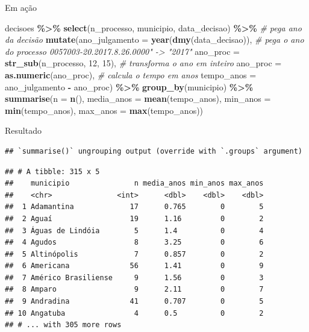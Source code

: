 \documentclass[
  10pt,
  ignorenonframetext,
]{beamer}
\newenvironment{Shaded}{\begin{snugshade}}{\end{snugshade}}
\newcommand{\CommentTok}[1]{\textcolor[rgb]{0.56,0.35,0.01}{\textit{#1}}}
\newcommand{\DataTypeTok}[1]{\textcolor[rgb]{0.13,0.29,0.53}{#1}}
\newcommand{\DecValTok}[1]{\textcolor[rgb]{0.00,0.00,0.81}{#1}}
\newcommand{\KeywordTok}[1]{\textcolor[rgb]{0.13,0.29,0.53}{\textbf{#1}}}
\newcommand{\NormalTok}[1]{#1}
\newcommand{\OperatorTok}[1]{\textcolor[rgb]{0.81,0.36,0.00}{\textbf{#1}}}
\newcommand{\StringTok}[1]{\textcolor[rgb]{0.31,0.60,0.02}{#1}}
\begin{document}
\begin{frame}[fragile]{Em ação}
\protect\hypertarget{em-auxe7uxe3o-3}{}
\begin{Shaded}
\begin{Highlighting}[]
\NormalTok{decisoes }\OperatorTok{\%\textgreater{}\%}\StringTok{ }
\StringTok{  }\KeywordTok{select}\NormalTok{(n\_processo, municipio, data\_decisao) }\OperatorTok{\%\textgreater{}\%}
\StringTok{  }\CommentTok{\#        pega ano da decisão}
\StringTok{  }\KeywordTok{mutate}\NormalTok{(}\DataTypeTok{ano\_julgamento =} \KeywordTok{year}\NormalTok{(}\KeywordTok{dmy}\NormalTok{(data\_decisao)),}
         \CommentTok{\# pega o ano do processo 0057003{-}20.2017.8.26.0000" {-}\textgreater{} "2017"}
         \DataTypeTok{ano\_proc =} \KeywordTok{str\_sub}\NormalTok{(n\_processo, }\DecValTok{12}\NormalTok{, }\DecValTok{15}\NormalTok{),}
         \CommentTok{\# transforma o ano em inteiro}
         \DataTypeTok{ano\_proc =} \KeywordTok{as.numeric}\NormalTok{(ano\_proc),}
         \CommentTok{\# calcula o tempo em anos}
         \DataTypeTok{tempo\_anos =}\NormalTok{ ano\_julgamento }\OperatorTok{{-}}\StringTok{ }\NormalTok{ano\_proc) }\OperatorTok{\%\textgreater{}\%}\StringTok{ }
\StringTok{  }\KeywordTok{group\_by}\NormalTok{(municipio) }\OperatorTok{\%\textgreater{}\%}\StringTok{ }
\StringTok{  }\KeywordTok{summarise}\NormalTok{(}\DataTypeTok{n =} \KeywordTok{n}\NormalTok{(),}
            \DataTypeTok{media\_anos =} \KeywordTok{mean}\NormalTok{(tempo\_anos),}
            \DataTypeTok{min\_anos =} \KeywordTok{min}\NormalTok{(tempo\_anos),}
            \DataTypeTok{max\_anos =} \KeywordTok{max}\NormalTok{(tempo\_anos)) }
\end{Highlighting}
\end{Shaded}
\end{frame}

\begin{frame}[fragile]{Resultado}
\protect\hypertarget{resultado}{}
\begin{verbatim}
## `summarise()` ungrouping output (override with `.groups` argument)
\end{verbatim}

\begin{verbatim}
## # A tibble: 315 x 5
##    municipio               n media_anos min_anos max_anos
##    <chr>               <int>      <dbl>    <dbl>    <dbl>
##  1 Adamantina             17      0.765        0        5
##  2 Aguaí                  19      1.16         0        2
##  3 Águas de Lindóia        5      1.4          0        4
##  4 Agudos                  8      3.25         0        6
##  5 Altinópolis             7      0.857        0        2
##  6 Americana              56      1.41         0        9
##  7 Américo Brasiliense     9      1.56         0        3
##  8 Amparo                  9      2.11         0        7
##  9 Andradina              41      0.707        0        5
## 10 Angatuba                4      0.5          0        2
## # ... with 305 more rows
\end{verbatim}
\end{frame}
\end{document}
